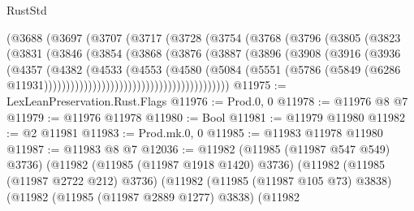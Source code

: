 \begin{lexlean}{RustStd}
\begin{coremodule}
                            (@3688
                              (@3697
                                (@3707
                                  (@3717
                                    (@3728
                                      (@3754
                                        (@3768
                                          (@3796
                                            (@3805
                                              (@3823
                                                (@3831
                                                  (@3846
                                                    (@3854
                                                      (@3868
                                                        (@3876
                                                          (@3887
                                                            (@3896
                                                              (@3908
                                                                (@3916
                                                                  (@3936
                                                                    (@4357
                                                                      (@4382
                                                                        (@4533
                                                                          (@4553
                                                                            (@4580
                                                                              (@5084
                                                                                (@5551
                                                                                  (@5786
                                                                                    (@5849
                                                                                      (@6286
                                                                                        @11931))))))))))))))))))))))))))))))))))))))))))
@11975 := LexLeanPreservation.Rust.Flags
@11976 := Prod.{0, 0}
@11978 := @11976 @8 @7
@11979 := @11976 @11978
@11980 := Bool
@11981 := @11979 @11980
@11982 := @2 @11981
@11983 := Prod.mk.{0, 0}
@11985 := @11983 @11978 @11980
@11987 := @11983 @8 @7
@12036 := @11982
    (@11985 (@11987 @547 @549) @3736)
    (@11982
      (@11985 (@11987 @1918 @1420) @3736)
      (@11982
        (@11985 (@11987 @2722 @212) @3736)
        (@11982
          (@11985 (@11987 @105 @73) @3838)
          (@11982
            (@11985 (@11987 @2889 @1277) @3838)
            (@11982

\end{coremodule}
\end{lexlean}

